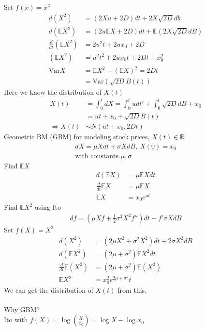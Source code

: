 \documentclass[12pt, letterpaper]{article}
\begin{document}
Set $f(x) = x^2$
\begin{align*}
    d(X^2) &= (2Xu + 2D)dt + 2X\sqrt{2D}db \\
    d(\mathbb{E}X^2) &= (2u\mathbb{E}X+2D)dt + \mathbb{E}(2X\sqrt{2D}dB)\\
    \frac{d}{dt}(\mathbb{E}X^2) &= 2u^2t + 2ux_0 + 2D \\
    (\mathbb{E}X^2) &= u^2t^2 + 2ux_0t + 2Dt + x_0^2 \\
    \text{Var}X &= \mathbb{E}X^2 - (\mathbb{E}X)^2 = 2Dt \\
    &= \text{Var}(\sqrt{2D}B(t))
\end{align*}
Here we know the distribution of $X(t)$
\begin{align*}
    X(t) &= \int_{0}^{t}dX = \int_{0}^{t}udt' + \int_{0}^{t}\sqrt{2D}dB + x_0 \\
    &= ut + x_0 + \sqrt{2D}B(t) \\
    \Rightarrow X(t) &\sim N(ut+x_0, 2Dt)
\end{align*}
 Geometric BM (GBM) for modeling stock prices, $X(t) \in \mathbb{R}$
\begin{align*}
    dX = \mu Xdt + \sigma XdB,\ X(0) = x_0 \\
    \text{with constants } \mu, \sigma
\end{align*}
Find $\mathbb{E}X$ 
\begin{align*}
    d(\mathbb{E}X) &= \mu \mathbb{E}X dt \\
    \frac{d}{dt} \mathbb{E}X &= \mu \mathbb{E}X \\
    \mathbb{E}X &= x_0e^{\mu t}   
\end{align*}
Find $\mathbb{E}X^2$ using Ito
\begin{align*}
    df = (\mu Xf + \frac 12 \sigma^2 X^2 f'')dt + f'\sigma X dB
\end{align*}
Set $f(X) = X^2$
\begin{align*}
    d(X^2) &= (2\mu X^2 + \sigma^2X^2) dt + 2\sigma X^2dB \\
    d(\mathbb{E}X^2) &= (2\mu +\sigma^2) \mathbb{E}X^2dt \\
    \frac{d}{dt}\mathbb{E}(X^2) &= (2\mu + \sigma^2) \mathbb{E}(X^2) \\
    \mathbb{E}X^2 &= x_0^2e^{2\mu +\sigma^2}t
\end{align*}
We can get the distribution of $X(t)$ from this. \\ \\
Why GBM? \\
Ito with $f(X) = \log (\frac{X}{x_0}) = \log X - \log x_0$
\end{document}
